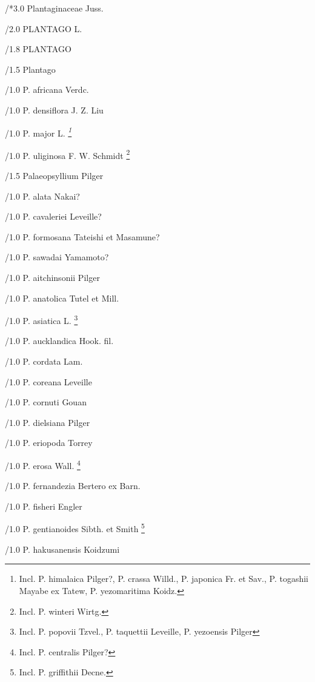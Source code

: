 \documentclass{article}
\begin{document}
\begin{classif}{1.0}

/*3.0 Plantaginaceae Juss.

/2.0 PLANTAGO L.

/1.8 PLANTAGO

/1.5 Plantago

        /1.0 {P. africana} Verdc.

        /1.0 {P. densiflora} J. Z. Liu

        /1.0 {P. major} L. \sl \footnote{Incl. \KURN P.
        himalaica Pilger?, \KURN P. crassa Willd., \KURN P.
        japonica Fr. et Sav., \KURN P. togashii Mayabe ex Tatew,
        \KURN P. yezomaritima Koidz.}

        /1.0 {P. uliginosa} F. W. Schmidt \footnote{Incl. \KURN
        P. winteri Wirtg.}

/1.5 Palaeopsyllium Pilger

        /1.0 {P. alata} Nakai?

        /1.0 {P. cavaleriei} Leveille?

        /1.0 {P. formosana} Tateishi et Masamune?

        /1.0 {P. sawadai} Yamamoto?

        /1.0 {P. aitchinsonii} Pilger

        /1.0 {P. anatolica} Tutel et Mill.

        /1.0 {P. asiatica} L. \footnote{Incl. \KURN P. popovii
        Tzvel., \KURN P. taquettii Leveille, \KURN P. yezoensis
        Pilger}

        /1.0 {P. aucklandica} Hook. fil.

        /1.0 {P. cordata} Lam.

        /1.0 {P. coreana} Leveille

        /1.0 {P. cornuti} Gouan

        /1.0 {P. dielsiana} Pilger

        /1.0 {P. eriopoda} Torrey

        /1.0 {P. erosa} Wall. \footnote{Incl. \KURN P. centralis
        Pilger?}

        /1.0 {P. fernandezia} Bertero ex Barn.

        /1.0 {P. fisheri} Engler

        /1.0 {P. gentianoides} Sibth. et Smith \footnote{Incl.
        \KURN P. griffithii Decne.}

        /1.0 {P. hakusanensis} Koidzumi


\end{classif}
\end{document}
